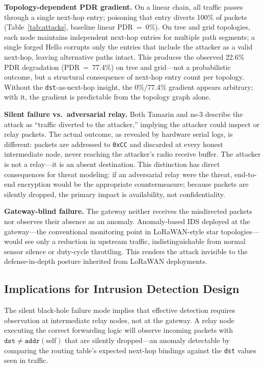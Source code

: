\documentclass[preprint,12pt]{elsarticle}
\begin{document}
\textbf{Topology-dependent PDR gradient.}
On a linear chain, all traffic passes through a single next-hop
entry; poisoning that entry diverts 100\% of packets
(Table~\ref{tab:attacks}, baseline linear PDR~=~0\%).
On tree and grid topologies, each node maintains independent
next-hop entries for multiple path segments; a single forged
Hello corrupts only the entries that include the attacker as
a valid next-hop, leaving alternative paths intact.
This produces the observed 22.6\% PDR degradation (PDR~=~77.4\%)
on tree and grid—not a probabilistic outcome, but a structural
consequence of next-hop entry count per topology.
Without the \texttt{dst}-as-next-hop insight, the 0\%/77.4\%
gradient appears arbitrary; with it, the gradient is predictable
from the topology graph alone.

\textbf{Silent failure vs.\ adversarial relay.}
Both Tamarin and ns-3 describe the attack as ``traffic diverted
to the attacker,'' implying the attacker could inspect or relay
packets.
The actual outcome, as revealed by hardware serial logs, is
different: packets are addressed to \texttt{0xCC} and discarded
at every honest intermediate node, never reaching the attacker's
radio receive buffer.
The attacker is not a relay—it is an absent destination.
This distinction has direct consequences for threat modeling:
if an adversarial relay were the threat, end-to-end encryption
would be the appropriate countermeasure; because packets are
silently dropped, the primary impact is availability, not
confidentiality.

\textbf{Gateway-blind failure.}
The gateway neither receives the misdirected packets nor
observes their absence as an anomaly.
Anomaly-based IDS deployed at the gateway—the conventional
monitoring point in LoRaWAN-style star topologies—would see
only a reduction in upstream traffic, indistinguishable from
normal sensor silence or duty-cycle throttling.
This renders the attack invisible to the defense-in-depth
posture inherited from LoRaWAN deployments.

\subsection{Implications for Intrusion Detection Design}
\label{sec:cross-layer-ids}

The silent black-hole failure mode implies that effective
detection requires observation at intermediate relay nodes,
not at the gateway.
A relay node executing the correct forwarding logic will observe
incoming packets with $\texttt{dst}\neq\texttt{addr}(\text{self})$
that are silently dropped—an anomaly detectable by comparing
the routing table's expected next-hop bindings against the
\texttt{dst} values seen in traffic.
\end{document}
